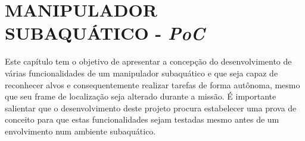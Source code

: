 %
%
%
%
%


\chapter{MANIPULADOR SUBAQUÁTICO - \textit{PoC}}
\label{chap:manisub-s}
Este capítulo tem o objetivo de apresentar a concepção do desenvolvimento de várias funcionalidades de um manipulador subaquático e que seja capaz de reconhecer alvos e consequentemente realizar tarefas de forma autônoma, mesmo que seu frame de localização seja alterado durante a missão. É importante salientar que o desenvolvimento deste projeto procura estabelecer uma prova de conceito para que estas funcionalidades sejam testadas mesmo antes de um envolvimento num ambiente subaquático.

